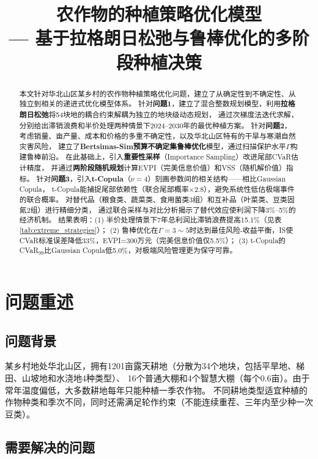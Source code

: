 \documentclass[12pt]{ctexart}
\title{\textbf{农作物的种植策略优化模型}\\
        \large --- 基于拉格朗日松弛与鲁棒优化的多阶段种植决策}
\author{}
\date{}
\begin{document}
\maketitle

\begin{abstract}
本文针对华北山区某乡村的农作物种植策略优化问题，建立了从确定性到不确定性、从独立到相关的递进式优化模型体系。
针对\textbf{问题1}，建立了混合整数规划模型，利用\textbf{拉格朗日松弛}将54块地的耦合约束解耦为独立的地块级动态规划，
通过次梯度法迭代求解，分别给出滞销浪费和半价处理两种情景下2024--2030年的最优种植方案。
针对\textbf{问题2}，考虑销量、亩产量、成本和价格的多重不确定性，以及华北山区特有的干旱与寒潮自然灾害风险，
建立了\textbf{Bertsimas-Sim预算不确定集鲁棒优化}模型，通过扫描保护水平$\Gamma$构建鲁棒前沿。
在此基础上，引入\textbf{重要性采样}（Importance Sampling）改进尾部CVaR估计精度，
并通过\textbf{两阶段随机规划}计算EVPI（完美信息价值）和VSS（随机解价值）指标。
针对\textbf{问题3}，引入\textbf{t-Copula}（$\nu=4$）刻画参数间的相关结构——相比Gaussian Copula，
t-Copula能捕捉尾部依赖性（联合尾部概率$\times$2.8），避免系统性低估极端事件的联合概率。
对替代品（粮食类、蔬菜类、食用菌类3组）和互补品（叶菜类、豆类固氮2组）进行精细分类，
通过联合采样与对比分析揭示了替代效应使利润下降3\%--5\%的经济机制。
结果表明：(1) 半价处理情景下7年总利润比滞销浪费提高15.1\%（见表\ref{tab:extreme_strategies}）；
(2) 鲁棒优化在$\Gamma=3\sim5$时达到最佳风险-收益平衡，IS使CVaR标准误差降低33\%，EVPI=300万元（完美信息价值仅5.5\%）；
(3) t-Copula的CVaR$_{99}$比Gaussian Copula低5.0\%，对极端风险管理更为保守可靠。
\end{abstract}

\section{问题重述}

\subsection{问题背景}

某乡村地处华北山区，拥有1201亩露天耕地（分散为34个地块，包括平旱地、梯田、山坡地和水浇地4种类型）、
16个普通大棚和4个智慧大棚（每个0.6亩）。由于常年温度偏低，大多数耕地每年只能种植一季农作物。
不同耕地类型适宜种植的作物种类和季次不同，同时还需满足轮作约束（不能连续重茬、三年内至少种一次豆类）。

\subsection{需要解决的问题}
\end{document}
